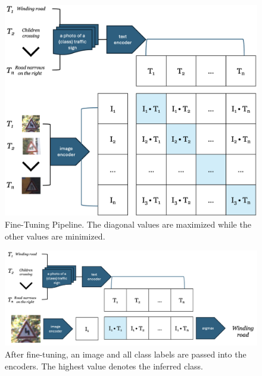 \documentclass{article}
\begin{document}
\begin{figure}[h]
    \centering
    \includegraphics[width=0.9\columnwidth]{images/fine_tune.png}
    \caption{Fine-Tuning Pipeline. The diagonal values are maximized while the other values are minimized.}
    \label{fig:main_figure1}
\end{figure}

\begin{figure}[h]
    \centering
    \includegraphics[width=0.9\columnwidth]{images/predict.png}
    \caption{After fine-tuning, an image and all class labels are passed into the encoders. The highest value denotes the inferred class.}
    \label{fig:main_figure2}
\end{figure}
\end{document}
